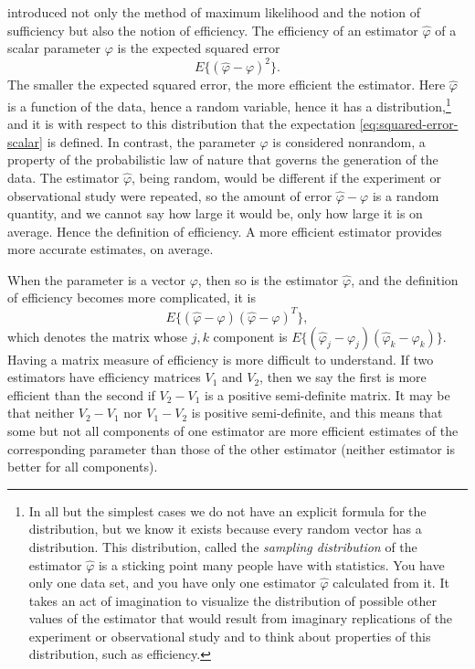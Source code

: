 \documentclass[11pt]{article}
\begin{document}
\citet{fisher1922} introduced not only the method of maximum likelihood and the
notion of sufficiency but also the notion of efficiency.  The efficiency
of an estimator $\hat{\varphi}$ of a scalar parameter $\varphi$ is the expected
squared error
\begin{equation} \label{eq:squared-error-scalar}
   E \{ (\hat{\varphi} - \varphi)^2 \}.
\end{equation}
The smaller the expected squared error, the more efficient the estimator.
Here $\hat{\varphi}$ is a function of the data, hence a random variable,
hence it has a distribution,\footnote{In all but the simplest cases we do
not have an explicit formula for the distribution, but we know it exists
because every random vector has a distribution.  This distribution, called
the \emph{sampling distribution} of the estimator $\hat{\varphi}$ is a
sticking point many people have with statistics.  You have only one
data set, and you have only one estimator $\hat{\varphi}$ calculated from it.
It takes an act of imagination to visualize the distribution of possible other
values of the estimator that would result from imaginary replications of the
experiment or observational study and to think about properties of
this distribution, such as efficiency.}
and it is with respect to this distribution
that the expectation \eqref{eq:squared-error-scalar} is defined.
In contrast, the parameter $\varphi$
is considered nonrandom, a property of the probabilistic law of nature that
governs the generation of the data.  The estimator $\hat{\varphi}$, being
random, would be different if the experiment or observational study were
repeated, so the amount of error $\hat{\varphi} - \varphi$ is a random
quantity, and we cannot say how large it would be, only how large it
is on average.
Hence the definition of efficiency.  A more efficient estimator provides
more accurate estimates, on average.

When the parameter is a vector $\varphi$,
then so is the estimator $\hat{\varphi}$,
and the definition of efficiency becomes more complicated,
it is
\begin{equation} \label{eq:squared-error-vector}
   E \{ (\hat{\varphi} - \varphi) (\hat{\varphi} - \varphi)^T \},
\end{equation}
which denotes the matrix whose $j, k$ component is
$E \{ (\hat{\varphi}_j - \varphi_j) (\hat{\varphi}_k - \varphi_k) \}$.
Having a matrix measure of efficiency is more difficult to understand.
If two estimators have efficiency matrices $V_1$ and $V_2$, then we say
the first is more efficient than the second if $V_2 - V_1$ is a positive
semi-definite matrix.  It may be that neither $V_2 - V_1$ nor $V_1 - V_2$ is
positive semi-definite, and this means that some but not all components
of one estimator
are more efficient estimates of the corresponding parameter than those of
the other estimator (neither estimator is better for all components).
\end{document}

